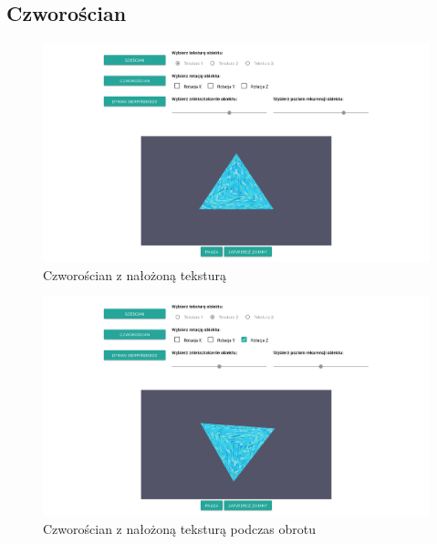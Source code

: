 \documentclass[12pt,a4paper,titlepage]{article}
\begin{document}
\subsection{Czworościan}
\begin{figure}[H]
\centering
\includegraphics[width=14cm]{images/tetrahedron_still.png}
\caption{Czworościan z nałożoną teksturą}
\label{fig:eggWithLight}
\end{figure}

\begin{figure}[H]
\centering
\includegraphics[width=14cm]{images/tetrahedron_rotating.png}
\caption{Czworościan z nałożoną teksturą podczas obrotu}
\label{fig:eggWithLight}
\end{figure}
\end{document}
